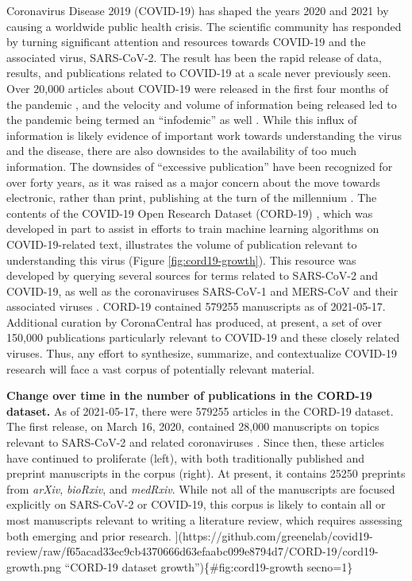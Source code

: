 \documentclass[sigconf]{acmart}
\begin{document}
Coronavirus Disease 2019 (COVID-19) has shaped the years 2020 and 2021 by causing a worldwide public health crisis.
The scientific community has responded by turning significant attention and resources towards COVID-19 and the associated virus, SARS-CoV-2.
The result has been the rapid release of data, results, and publications related to COVID-19 at a scale never previously seen.
Over 20,000 articles about COVID-19 were released in the first four months of the pandemic \citep{7ub6VM4Z}, and the velocity and volume of information being released led to the pandemic being termed an ``infodemic'' as well \citep{7ub6VM4Z, nnfOazAC}.
While this influx of information is likely evidence of important work towards understanding the virus and the disease, there are also downsides to the availability of too much information.
The downsides of ``excessive publication'' have been recognized for over forty years, as it was raised as a major concern about the move towards electronic, rather than print, publishing at the turn of the millennium \citep{DfSr1Ohc}.
The contents of the COVID-19 Open Research Dataset (CORD-19) \citep{CiOwklc6}, which was developed in part to assist in efforts to train machine learning algorithms on COVID-19-related text, illustrates the volume of publication relevant to understanding this virus (Figure \ref{fig:cord19-growth}).
This resource was developed by querying several sources for terms related to SARS-CoV-2 and COVID-19, as well as the coronaviruses SARS-CoV-1 and MERS-CoV and their associated viruses \citep{CiOwklc6}.
CORD-19 contained 579255 manuscripts as of 2021-05-17.
Additional curation by CoronaCentral \citep{zQ1JIn2J} has produced, at present, a set of over 150,000 publications particularly relevant to COVID-19 and these closely related viruses.
Thus, any effort to synthesize, summarize, and contextualize COVID-19 research will face a vast corpus of potentially relevant material.

\textbf{Change over time in the number of publications in the CORD-19 dataset.}
As of 2021-05-17, there were 579255 articles in the CORD-19 dataset.
The first release, on March 16, 2020, contained 28,000 manuscripts on topics relevant to SARS-CoV-2 and related coronaviruses \citep{CiOwklc6}.
Since then, these articles have continued to proliferate (left), with both traditionally published and preprint manuscripts in the corpus (right).
At present, it contains 25250 preprints from \emph{arXiv}, \emph{bioRxiv}, and \emph{medRxiv}.
While not all of the manuscripts are focused explicitly on SARS-CoV-2 or COVID-19, this corpus is likely to contain all or most manuscripts relevant to writing a literature review, which requires assessing both emerging and prior research.
{]}(https://github.com/greenelab/covid19-review/raw/f65acad33ec9cb4370666d63efaabc099e8794d7/CORD-19/cord19-growth.png ``CORD-19 dataset growth'')\{\#fig:cord19-growth secno=1\}
\end{document}
